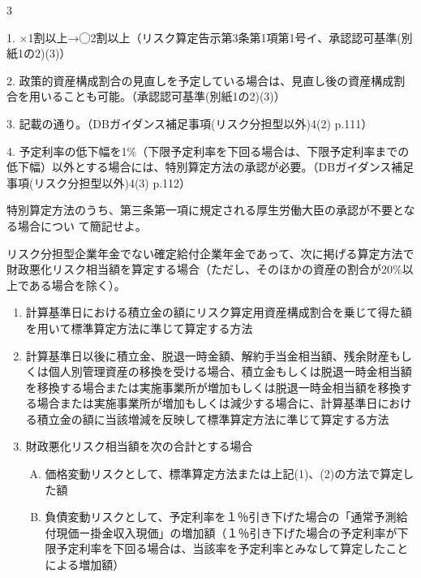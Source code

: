 \begin{answerbox}
  3
\end{answerbox}

\begin{explanationbox}
  1. ×1割以上→◯2割以上（リスク算定告示第3条第1項第1号イ、承認認可基準(別紙1の2)(3)）

  2. 政策的資産構成割合の見直しを予定している場合は、見直し後の資産構成割合を用いることも可能。（承認認可基準(別紙1の2)(3)）

  3. 記載の通り。（DBガイダンス補足事項(リスク分担型以外)4(2) p.111）

  4. 予定利率の低下幅を1\%（下限予定利率を下回る場合は、下限予定利率までの低下幅）以外とする場合には、特別算定方法の承認が必要。（DBガイダンス補足事項(リスク分担型以外)4(3) p.112）
\end{explanationbox}

\begin{shortanswer}
  特別算定方法のうち、第三条第一項に規定される厚生労働大臣の承認が不要となる場合につい
て簡記せよ。
\end{shortanswer}

\begin{answerbox}
  リスク分担型企業年金でない確定給付企業年金であって、次に掲げる算定方法で財政悪化リスク相当額を算定する場合（ただし、そのほかの資産の割合が20\%以上である場合を除く）。
  \begin{enumerate}[(1)]
    \item 計算基準日における積立金の額にリスク算定用資産構成割合を乗じて得た額を用いて標準算定方法に準じて算定する方法
    \item 計算基準日以後に積立金、脱退一時金額、解約手当金相当額、残余財産もしくは個人別管理資産の移換を受ける場合、積立金もしくは脱退一時金相当額を移換する場合または実施事業所が増加もしくは脱退一時金相当額を移換する場合または実施事業所が増加もしくは減少する場合に、計算基準日における積立金の額に当該増減を反映して標準算定方法に準じて算定する方法
    \item 財政悪化リスク相当額を次の合計とする場合
    \begin{enumerate}[(A)]
      \item 価格変動リスクとして、標準算定方法または上記(1)、(2)の方法で算定した額
      \item 負債変動リスクとして、予定利率を１％引き下げた場合の「通常予測給付現価ー掛金収入現価」の増加額（１％引き下げた場合の予定利率が下限予定利率を下回る場合は、当該率を予定利率とみなして算定したことによる増加額）
    \end{enumerate}
  \end{enumerate}
\end{answerbox}

